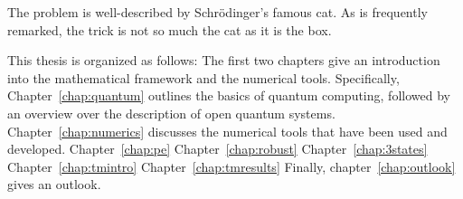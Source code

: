 The problem is well-described by Schrödinger's famous cat.
As is frequently remarked, the trick is not so much the cat as it is the box.


This thesis is organized as follows: The first two chapters give an introduction
into the mathematical framework and the numerical tools.
Specifically, Chapter~\ref{chap:quantum} outlines the basics of quantum
computing, followed by an overview over the description of open quantum systems.
Chapter~\ref{chap:numerics} discusses the numerical tools that have been used
and developed.
Chapter~\ref{chap:pe}
Chapter~\ref{chap:robust}
Chapter~\ref{chap:3states}
Chapter~\ref{chap:tmintro}
Chapter~\ref{chap:tmresults}
Finally, chapter~\ref{chap:outlook} gives an outlook.

